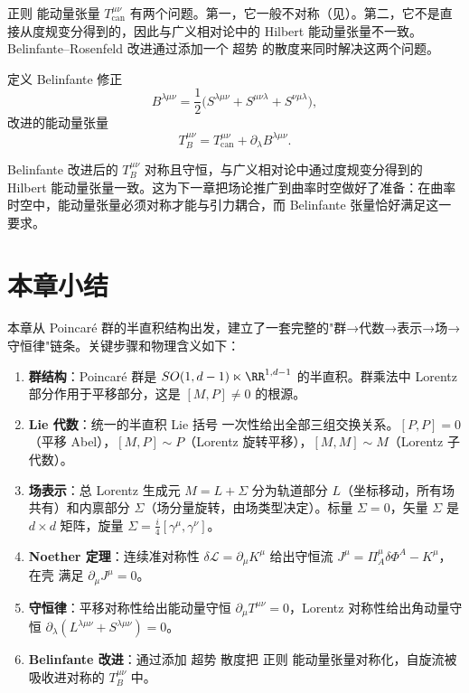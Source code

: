 正则 能动量张量 $T^{\mu\nu}_{\text{can}}$ 有两个问题。第一，它一般不对称（见）。第二，它不是直接从度规变分得到的，因此与广义相对论中的 Hilbert 能动量张量不一致。Belinfante--Rosenfeld 改进通过添加一个 超势 的散度来同时解决这两个问题。

定义 Belinfante 修正
\begin{equation}\label{eq:ms-poincare-B-def}
B^{\lambda\mu\nu}=\frac{1}{2}\big(S^{\lambda\mu\nu}+S^{\mu\nu\lambda}+S^{\nu\mu\lambda}\big),
\end{equation}
改进的能动量张量
\begin{equation}\label{eq:ms-poincare-TB-def}
{
T_B^{\mu\nu}=T_{\text{can}}^{\mu\nu}+\partial_\lambda B^{\lambda\mu\nu}.
}
\end{equation}

Belinfante 改进后的 $T_B^{\mu\nu}$ 对称且守恒，与广义相对论中通过度规变分得到的 Hilbert 能动量张量一致。这为下一章把场论推广到曲率时空做好了准备：在曲率时空中，能动量张量必须对称才能与引力耦合，而 Belinfante 张量恰好满足这一要求。

\section*{本章小结}

本章从 Poincaré 群的半直积结构出发，建立了一套完整的"群→代数→表示→场→守恒律"链条。关键步骤和物理含义如下：

\begin{enumerate}
\item \textbf{群结构}：Poincaré 群是 $SO(1,d-1)\ltimes\RR^{1,d-1}$ 的半直积。群乘法中 Lorentz 部分作用于平移部分，这是 $[M,P]\neq 0$ 的根源。
\item \textbf{Lie 代数}：统一的半直积 Lie 括号 一次性给出全部三组交换关系。$[P,P]=0$（平移 Abel），$[M,P]\sim P$（Lorentz 旋转平移），$[M,M]\sim M$（Lorentz 子代数）。
\item \textbf{场表示}：总 Lorentz 生成元 $M=L+\Sigma$ 分为轨道部分 $L$（坐标移动，所有场共有）和内禀部分 $\Sigma$（场分量旋转，由场类型决定）。标量 $\Sigma=0$，矢量 $\Sigma$ 是 $d\times d$ 矩阵，旋量 $\Sigma=\frac{i}{4}[\gamma^\mu,\gamma^\nu]$。
\item \textbf{Noether 定理}：连续准对称性 $\delta\mathcal{L}=\partial_\mu K^\mu$ 给出守恒流 $J^\mu=\Pi_A^\mu\delta\Phi^A-K^\mu$，在壳 满足 $\partial_\mu J^\mu=0$。
\item \textbf{守恒律}：平移对称性给出能动量守恒 $\partial_\mu T^{\mu\nu}=0$，Lorentz 对称性给出角动量守恒 $\partial_\lambda(L^{\lambda\mu\nu}+S^{\lambda\mu\nu})=0$。
\item \textbf{Belinfante 改进}：通过添加 超势 散度把 正则 能动量张量对称化，自旋流被吸收进对称的 $T_B^{\mu\nu}$ 中。
\end{enumerate}

